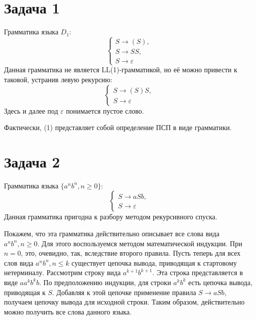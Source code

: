\documentclass[11pt]{article}
\author{Sergey Makarov}
\date{\today}
\title{}
\begin{document}
\tableofcontents


\section{Задача 1}
\label{sec:orgc33ccd3}
Грамматика языка \(D_1\):
\begin{equation}
\begin{cases}
S \rightarrow (S), \\
S \rightarrow SS, \\
S \rightarrow \varepsilon
\end{cases}
\end{equation}
Данная грамматика не является LL(1)-грамматикой, но её можно привести к таковой, устранив
левую рекурсию:
\begin{equation}
\begin{cases}
S \rightarrow (S)S, \\
S \rightarrow \varepsilon
\end{cases}
\end{equation}
Здесь и далее под \(\varepsilon\) понимается пустое слово.

Фактически, (1) представляет собой определение ПСП в виде грамматики.
\section{Задача 2}
\label{sec:org7333b9f}
Грамматика языка \(\{a^nb^n, n \geq 0\}\):
\begin{equation}
\begin{cases}
S \rightarrow aSb, \\
S \rightarrow \varepsilon
\end{cases}
\end{equation}
Данная грамматика пригодна к разбору методом рекурсивного спуска.

Покажем, что эта грамматика действительно описывает все слова вида $a^nb^n, n \geq 0$. Для
этого воспользуемся методом математической индукции. При $n = 0$, это, очевидно, так, вследствие
второго правила. Пусть теперь для всех слов вида $a^nb^n, n \leq k$ существует цепочка вывода,
приводящая к стартовому нетерминалу. Рассмотрим строку вида $a^{k + 1}b^{k + 1}$. Эта строка
представляется в виде $aa^kb^kb$. По предположению индукции, для строки $a^kb^k$ есть цепочка
вывода, приводящая к $S$. Добавляя к этой цепочке применение правила $S \rightarrow aSb$,
получаем цепочку вывода для исходной строки. Таким образом, действительно можно получить все
слова данного языка.
\end{document}
